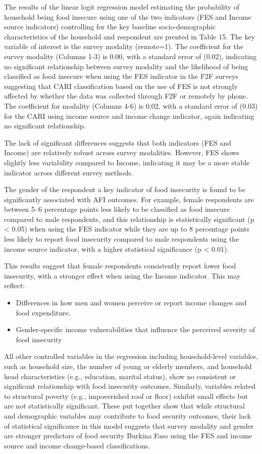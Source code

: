 \documentclass[11pt,harvard]{article}
\begin{document}
	The results of the linear logit regression model estimating the probability of household being food insecure using one of the two indicators (FES and Income source indicators) controlling for the key baseline socio-demographic characteristics of the household and respondent are prented in Table 15. The key variable of interest is the survey modality (remote=1). The coefficient for the survey modality (Columns 1-3) is 0.00, with a standard error of (0.02), indicating no significant relationship between survey modality and the likelihood of being classified as food insecure when using the FES indicator in the F2F surveys suggesting that CARI classification based on the use of FES is not strongly affected by whether the data was collected through F2F or remotely by phone. The coefficient for modality (Columns 4-6) is 0.02, with a standard error of (0.03) for the CARI using income source and income change indicator, again indicating no significant relationship.
	
	The lack of significant differences suggests that both indicators (FES and Income) are relatively robust across survey modalities. However, FES shows slightly less variability compared to Income, indicating it may be a more stable indicator across different survey methods.
	
	The gender of the respondent a key indicator of food insecurity is found to be significantly associated with AFI outcomes. For example, female respondents are between 5–6 percentage points less likely to be classified as food insecure compared to male respondents, and this relationship is statistically significant (p < 0.05) when using the FES indicator while they are up to 8 percentage points less likely to report food insecurity compared to male respondents using the income source indicator, with a higher statistical significance (p < 0.01).
	
	This results suggest that female respondents consistently report lower food insecurity, with a stronger effect when using the Income indicator. This may reflect:
	\begin{itemize}
	
	\item Differences in how men and women perceive or report income changes and food expenditure.
	\item Gender-specific income vulnerabilities that influence the perceived severity of food insecurity
	
	\end{itemize}
	All other controlled variables in the regression including household-level variables, such as household size, the number of young or elderly members, and household head characteristics (e.g., education, marital status), show no consistent or significant relationship with food insecurity outcomes.	Similarly, variables related to structural poverty (e.g., impoverished roof or floor) exhibit small effects but are not statistically significant. These put together show that while structural and demographic variables may contribute to food security outcomes, their lack of statistical significance in this model suggests that survey modality and gender are stronger predictors of food security Burkina Faso using the FES and income source and income change-based classifications.
	
\end{document}
